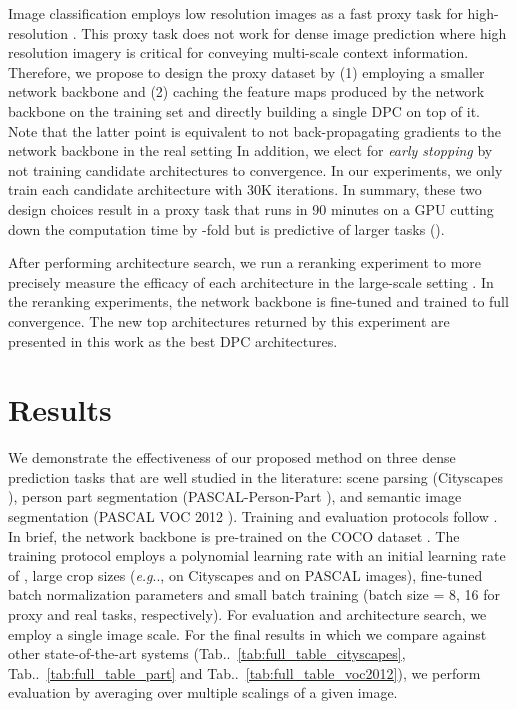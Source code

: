 \documentclass{article}
\makeatletter
\def\@onedot{\ifx\@let@token.\else.\null\fi\xspace}
\DeclareRobustCommand\onedot{\futurelet\@let@token\@onedot}
\newcommand{\tabref}[1]{Tab\onedot~\ref{#1}}
\def\eg{\emph{e.g}\onedot} \def\Eg{\emph{E.g}\onedot}
\makeatother
\begin{document}
Image classification employs low resolution images \cite{krizhevsky2009learning} as a fast proxy task for high-resolution \cite{ILSVRC15}. This proxy task does not work for dense image prediction where high resolution imagery is critical for conveying multi-scale context information.
Therefore, we propose to design the proxy dataset by (1) employing a smaller network backbone and (2) caching the feature maps produced by the network backbone on the training set and directly building a single DPC on top of it. Note that the latter point is equivalent to not back-propagating gradients to the network backbone in the real setting
In addition, we elect for {\it early stopping} by not training candidate architectures to convergence. In our experiments, we only train each candidate architecture with 30K iterations. In summary, these two design choices result in a proxy task that runs in 90 minutes on a GPU cutting down the computation time by -fold but is predictive of larger tasks ().

After performing architecture search, we run a reranking experiment to more precisely measure the efficacy of each architecture in the large-scale setting \cite{zoph2017neural,zoph2017learning, real2018regularized}. In the reranking experiments, the network backbone is fine-tuned and trained to  full convergence. The new top architectures returned by this experiment are presented in this work as the best DPC architectures.
 \section{Results}
\label{sec:experiments}

We demonstrate the effectiveness of our proposed method on three dense prediction tasks that are well studied in the literature:
scene parsing (Cityscapes \cite{Cordts2016Cityscapes}), person part segmentation (PASCAL-Person-Part \cite{chen_cvpr14}),
and semantic image segmentation (PASCAL VOC 2012 \cite{everingham2014pascal}). Training and evaluation protocols follow \cite{chen2017rethinking, deeplabv3plus2018}. In brief, the network backbone is pre-trained on the COCO dataset \cite{lin2014microsoft}. The training protocol employs a polynomial learning rate \cite{liu2015parsenet} with an initial learning rate of , large crop sizes (\eg,  on Cityscapes and  on PASCAL images), fine-tuned batch normalization parameters \cite{ioffe2015batch} and small batch training (batch size = 8, 16 for proxy and real tasks, respectively). For evaluation and architecture search, we employ a single image scale. For the final results in which we compare against other state-of-the-art systems (\tabref{tab:full_table_cityscapes}, \tabref{tab:full_table_part} and \tabref{tab:full_table_voc2012}), we perform evaluation by averaging over multiple scalings of a given image.
\end{document}
